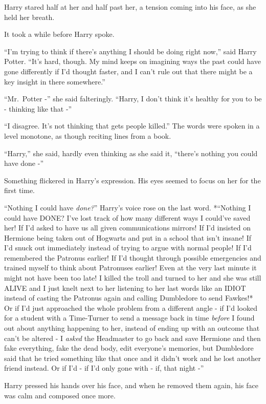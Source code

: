 Harry stared half at her and half past her, a tension coming into his
face, as she held her breath.

It took a while before Harry spoke.

``I'm trying to think if there's anything I should be doing right now,''
said Harry Potter. ``It's hard, though. My mind keeps on imagining ways
the past could have gone differently if I'd thought faster, and I can't
rule out that there might be a key insight in there somewhere.''

``Mr.~Potter -'' she said falteringly. ``Harry, I don't think it's
healthy for you to be - thinking like that -''

``I disagree. It's not thinking that gets people killed.'' The words
were spoken in a level monotone, as though reciting lines from a book.

``Harry,'' she said, hardly even thinking as she said it, ``there's
nothing you could have done -''

Something flickered in Harry's expression. His eyes seemed to focus on
her for the first time.

``Nothing I could have \emph{done?}'' Harry's voice rose on the last
word. *``Nothing I could have DONE? I've lost track of how many
different ways I could've saved her! If I'd asked to have us all given
communications mirrors! If I'd insisted on Hermione being taken out of
Hogwarts and put in a school that isn't insane! If I'd snuck out
immediately instead of trying to argue with normal people! If I'd
remembered the Patronus earlier! If I'd thought through possible
emergencies and trained myself to think about Patronuses earlier! Even
at the very last minute it might not have been too late! I killed the
troll and turned to her and she was still ALIVE and I just knelt next to
her listening to her last words like an IDIOT instead of casting the
Patronus again and calling Dumbledore to send Fawkes!* Or if I'd just
approached the whole problem from a different angle - if I'd looked for
a student with a Time-Turner to send a message back in time
\emph{before} I found out about anything happening to her, instead of
ending up with an outcome that can't be altered - I \emph{asked} the
Headmaster to go back and save Hermione and then fake everything, fake
the dead body, edit everyone's memories, but Dumbledore said that he
tried something like that once and it didn't work and he lost another
friend instead. Or if I'd - if I'd only gone with - if, that night -''

Harry pressed his hands over his face, and when he removed them again,
his face was calm and composed once more.

